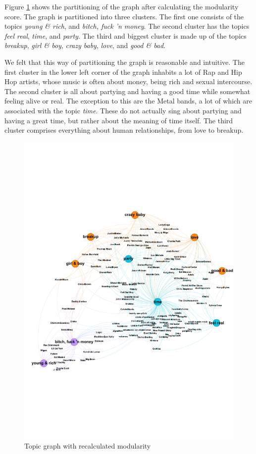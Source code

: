 \documentclass[10pt,a4paper]{article}
\begin{document}
		Figure \ref{fig:topicnewmod} shows the partitioning of the graph after calculating the modularity score. The graph is partitioned into three clusters. The first one consists of the topics \textit{young \& rich}, and \textit{bitch, fuck 'n money}. The second cluster has the topics \textit{feel real}, \textit{time}, and \textit{party}. The third and biggest cluster is made up of the topics \textit{breakup}, \textit{girl \& boy}, \textit{crazy baby}, \textit{love}, and \textit{good \& bad}.
		
		We felt that this way of partitioning the graph is reasonable and intuitive. The first cluster in the lower left corner of the graph inhabits a lot of Rap and Hip Hop artists, whose music is often about money, being rich and sexual intercourse. The second cluster is all about partying and having a good time while somewhat feeling alive or real. The exception to this are the Metal bands, a lot of which are associated with the topic \textit{time}. These do not actually sing about partying and having a great time, but rather about the meaning of time itself. The third cluster comprises everything about human relationships, from love to breakup.
		
		\begin{figure}[htb]
			\centering
			\includegraphics[trim=0mm 60mm 0mm 50mm, clip, width=\linewidth]{data/topic_graph_new_modularity}
			\caption{Topic graph with recalculated modularity}
			\label{fig:topicnewmod}
		\end{figure}
		
\end{document}
